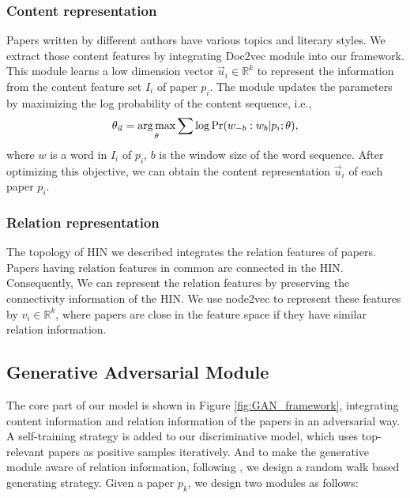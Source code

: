 \documentclass[letterpaper]{article} %
\begin{document}
\subsubsection{Content representation} \label{sec:content}
Papers written by different authors have various topics and literary styles. 
We extract those content features by integrating Doc2vec module \cite{Doc2vec} into our framework. This module learns a low dimension vector $\vec{u}_i \in \mathbb{R}^k$ to represent the information from the content feature set $I_i$ of paper $p_i$. The module updates the parameters by maximizing the log probability of the content sequence, i.e.,
\begin{equation}
\centering
\theta_{\vec{u}} = \mathop{\arg\max}_{\theta} \sum \log \text{Pr}(w_{-b}:w_{b}|p_i; \theta),
\label{eq:doc2vec}
\end{equation}
where $w$ is a word in $I_i$ of $p_i$, $b$ is the window size of the word sequence. 
After optimizing this objective, we can obtain the content representation $\vec{u}_i$ of each paper $p_i$.

\subsubsection{Relation representation} \label{sec:relation}
The topology of HIN we described integrates the relation features of papers. 
Papers having relation features in common are connected in the HIN.
Consequently, We can represent the relation features by preserving the connectivity information of the HIN. 
We use node2vec \cite{Node2vec} to represent these features by $v_i \in \mathbb{R}^k$, where papers are close in the feature space if they have similar relation information. 

\subsection{Generative Adversarial Module}

The core part of our model is shown in Figure \ref{fig:GAN_framework}, integrating content information and relation information of the papers in an adversarial way.
A self-training strategy is added to our discriminative model, which uses top-relevant papers as positive samples iteratively. 
And to make the generative module aware of relation information, following \cite{GraphGAN}, we design a random walk based generating strategy.
Given a paper $p_k$, we design two modules as follows: 
\end{document}
